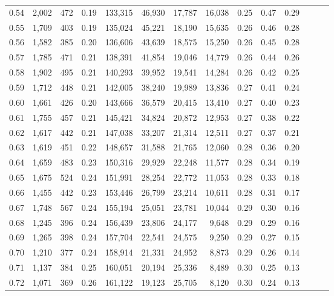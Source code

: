 \begin{tabular}{rrrrrrrrrrrrrr}
0.54 &  2,002 &  472 &  0.19 &  133,315 &   46,930 &  17,787 &  16,038 &  0.25 &  0.47 &      0.29 \\
0.55 &  1,709 &  403 &  0.19 &  135,024 &   45,221 &  18,190 &  15,635 &  0.26 &  0.46 &      0.28 \\
0.56 &  1,582 &  385 &  0.20 &  136,606 &   43,639 &  18,575 &  15,250 &  0.26 &  0.45 &      0.28 \\
0.57 &  1,785 &  471 &  0.21 &  138,391 &   41,854 &  19,046 &  14,779 &  0.26 &  0.44 &      0.26 \\
0.58 &  1,902 &  495 &  0.21 &  140,293 &   39,952 &  19,541 &  14,284 &  0.26 &  0.42 &      0.25 \\
0.59 &  1,712 &  448 &  0.21 &  142,005 &   38,240 &  19,989 &  13,836 &  0.27 &  0.41 &      0.24 \\
0.60 &  1,661 &  426 &  0.20 &  143,666 &   36,579 &  20,415 &  13,410 &  0.27 &  0.40 &      0.23 \\
0.61 &  1,755 &  457 &  0.21 &  145,421 &   34,824 &  20,872 &  12,953 &  0.27 &  0.38 &      0.22 \\
0.62 &  1,617 &  442 &  0.21 &  147,038 &   33,207 &  21,314 &  12,511 &  0.27 &  0.37 &      0.21 \\
0.63 &  1,619 &  451 &  0.22 &  148,657 &   31,588 &  21,765 &  12,060 &  0.28 &  0.36 &      0.20 \\
0.64 &  1,659 &  483 &  0.23 &  150,316 &   29,929 &  22,248 &  11,577 &  0.28 &  0.34 &      0.19 \\
0.65 &  1,675 &  524 &  0.24 &  151,991 &   28,254 &  22,772 &  11,053 &  0.28 &  0.33 &      0.18 \\
0.66 &  1,455 &  442 &  0.23 &  153,446 &   26,799 &  23,214 &  10,611 &  0.28 &  0.31 &      0.17 \\
0.67 &  1,748 &  567 &  0.24 &  155,194 &   25,051 &  23,781 &  10,044 &  0.29 &  0.30 &      0.16 \\
0.68 &  1,245 &  396 &  0.24 &  156,439 &   23,806 &  24,177 &   9,648 &  0.29 &  0.29 &      0.16 \\
0.69 &  1,265 &  398 &  0.24 &  157,704 &   22,541 &  24,575 &   9,250 &  0.29 &  0.27 &      0.15 \\
0.70 &  1,210 &  377 &  0.24 &  158,914 &   21,331 &  24,952 &   8,873 &  0.29 &  0.26 &      0.14 \\
0.71 &  1,137 &  384 &  0.25 &  160,051 &   20,194 &  25,336 &   8,489 &  0.30 &  0.25 &      0.13 \\
0.72 &  1,071 &  369 &  0.26 &  161,122 &   19,123 &  25,705 &   8,120 &  0.30 &  0.24 &      0.13 \\

\end{tabular}
